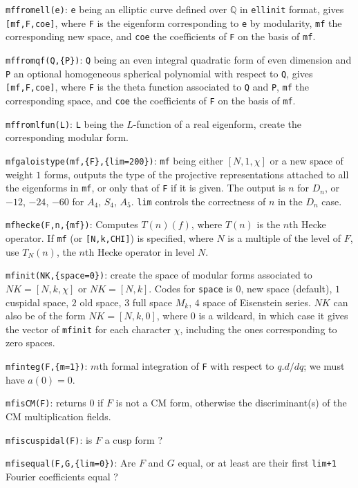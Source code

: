 \documentclass[11pt]{article}
\newcommand{\Q}{{\mathbb Q}}
\def\kbd#1{{\tt #1}}
\begin{document}
\kbd{mffromell(e)}: \kbd{e} being an elliptic curve defined over $\Q$ in
\kbd{ellinit} format, gives \kbd{[mf,F,coe]}, where \kbd{F} is the eigenform
corresponding to \kbd{e} by modularity, \kbd{mf} the corresponding new space,
and \kbd{coe} the coefficients of \kbd{F} on the basis of \kbd{mf}.

\kbd{mffromqf(Q,\{P\})}: \kbd{Q} being an even integral quadratic form of even
dimension and \kbd{P} an optional homogeneous spherical polynomial with
respect to \kbd{Q}, gives \kbd{[mf,F,coe]}, where \kbd{F} is the theta
function associated to \kbd{Q} and \kbd{P}, \kbd{mf} the corresponding space,
and \kbd{coe} the coefficients of \kbd{F} on the basis of \kbd{mf}.

\kbd{mffromlfun(L)}: \kbd{L} being the $L$-function of a real eigenform,
create the corresponding modular form.

\kbd{mfgaloistype(mf,\{F\},\{lim=200\})}: \kbd{mf} being either $[N,1,\chi]$ or
a new space of weight $1$ forms, outputs the type of the projective
representations attached to all the eigenforms in \kbd{mf}, or only that of
\kbd{F} if it is given. The output is $n$ for $D_n$, or $-12$, $-24$, $-60$ for
$A_4$, $S_4$, $A_5$. \kbd{lim} controls the correctness of $n$ in the $D_n$
case.

\kbd{mfhecke(F,n,\{mf\})}: Computes $T(n)(f)$, where $T(n)$ is the $n$th Hecke
operator. If \kbd{mf} (or \kbd{[N,k,CHI]}) is specified, where $N$ is a
multiple of the level of $F$, use $T_N(n)$, the $n$th Hecke operator
in level $N$.

\kbd{mfinit(NK,\{space=0\})}: create the space of modular forms associated to
$NK=[N,k,\chi]$ or $NK=[N,k]$. Codes for \kbd{space} is $0$, new space
(default), $1$ cuspidal space, $2$ old space, $3$ full space $M_k$,
$4$ space of Eisenstein series. $NK$ can also be of the form $NK=[N,k,0]$,
where $0$ is a wildcard, in which case it gives the vector of \kbd{mfinit}
for each character $\chi$, including the ones corresponding to zero spaces.

\kbd{mfinteg(F,\{m=1\})}: $m$th formal integration of \kbd{F} with respect
to $q.d/dq$; we must have $a(0)=0$.

\kbd{mfisCM(F)}: returns $0$ if $F$ is not a CM form, otherwise the
discriminant(s) of the CM multiplication fields.

\kbd{mfiscuspidal(F)}: is $F$ a cusp form ?

\kbd{mfisequal(F,G,\{lim=0\})}: Are $F$ and $G$ equal, or at least are their
first \kbd{lim+1} Fourier coefficients equal ?
\end{document}
